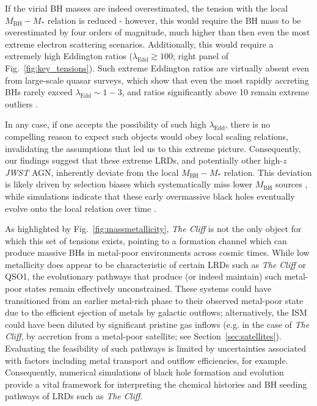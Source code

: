 \documentclass[fleqn,usenatbib]{mnras}
\newcommand{\jwst}{\textit{JWST}\xspace}
\newcommand{\cliff}{\textit{The Cliff}\xspace}
\begin{document}
If the virial BH masses are indeed overestimated, the tension with the local $M_\mathrm{BH}-M_\ast$ relation is reduced - however, this would require the BH mass to be overestimated by four orders of magnitude, much higher than then even the most extreme electron scattering scenarios. Additionally, this would require a extremely high Eddington ratios ($\lambda_\mathrm{Edd}\gtrsim 100$; right panel of Fig.~\ref{fig:key_tensions}). Such extreme Eddington ratios are virtually absent even from large-scale quasar surveys, which show that even the most rapidly accreting BHs rarely exceed $\lambda_\mathrm{Edd}\sim1-3$, and ratios significantly above 10 remain extreme outliers \citep[e.g.][]{Kollmeier2006, Jin2012}.

In any case, if one accepts the possibility of such high $\lambda_\mathrm{Edd}$, there is no compelling reason to expect such objects would obey local scaling relations, invalidating the assumptions that led us to this extreme picture. Consequently, our findings suggest that these extreme LRDs, and potentially other high-$z$ \jwst AGN, inherently deviate from the local $M_\mathrm{BH}-M_\ast$ relation. This deviation is likely driven by selection biases which systematically miss lower $M_\mathrm{BH}$ sources \citep[e.g.][]{Geris2026, Ziparo2026}, while simulations indicate that these early overmassive black holes eventually evolve onto the local relation over time \citep{Hu2026}.

As highlighted by Fig.~\ref{fig:massmetallicity}, \cliff is not the only object for which this set of tensions exists, pointing to a formation channel which can produce massive BHs in metal-poor environments across cosmic times. While low metallicity does appear to be characteristic of certain LRDs such as \cliff or QSO1, the evolutionary pathways that produce (or indeed maintain) such metal-poor states remain effectively unconstrained. These systems could have transitioned from an earlier metal-rich phase to their observed metal-poor state due to the efficient ejection of metals by galactic outflows; alternatively, the ISM could have been diluted by significant pristine gas inflows (e.g. in the case of \cliff, by accretion from a metal-poor satellite; see Section~\ref{sec:satellites}). Evaluating the feasibility of such pathways is limited by uncertainties associated with factors including metal transport and outflow efficiencies, for example. Consequently, numerical simulations of black hole formation and evolution provide a vital framework for interpreting the chemical histories and BH seeding pathways of LRDs such as \cliff.
\end{document}
